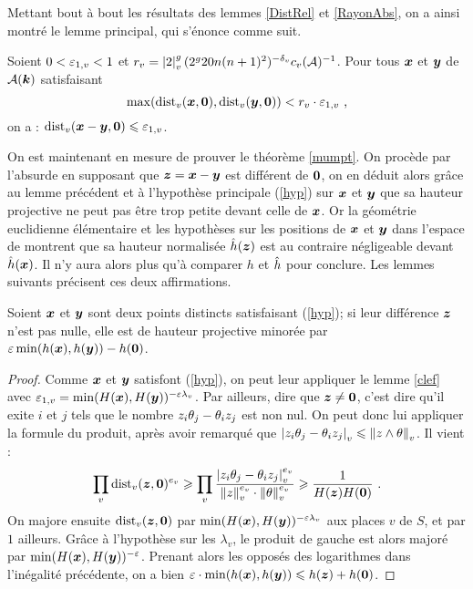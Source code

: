 Mettant bout à bout les résultats des lemmes \ref{DistRel} et \ref{RayonAbs}, on a ainsi montré le lemme principal, qui s'énonce comme suit.

\begin{lem} \label{clef}
Soient $0 < \varepsilon_{1,v} < 1$ et $r_v = \left\lvert2\right\rvert_{v}^g (2^g20n(n+1)^2)^{-{\delta_v}}c_v(\mathcal{A})^{-1}$. Pour tous ${\boldsymbol{x}}$ et ${\boldsymbol{y}}$ de $\mathcal{A}(\boldsymbol{k})$ satisfaisant 
\[ \max ( \mathrm{dist}_v({\boldsymbol{x}}, {\boldsymbol{0}}), \mathrm{dist}_v({\boldsymbol{y}}, {\boldsymbol{0}}) ) < r_v \cdot \varepsilon_{1,v} \text{ ,} \]
on a : $\mathrm{dist}_v({\boldsymbol{x}}-{\boldsymbol{y}}, {\boldsymbol{0}}) \leqslant \varepsilon_{1,v}$.
\end{lem}

On est maintenant en mesure de prouver le théorème \ref{mumpt}. On procède par l'absurde en supposant que ${\boldsymbol{z}} = {\boldsymbol{x}} - {\boldsymbol{y}}$ est différent de ${\boldsymbol{0}}$, on en déduit alors grâce au lemme précédent et à l'hypothèse principale (\ref{hyp}) sur ${\boldsymbol{x}}$ et ${\boldsymbol{y}}$ que sa hauteur projective ne peut pas être trop petite devant celle de ${\boldsymbol{x}}$. Or la géométrie euclidienne élémentaire et les hypothèses sur les positions de ${\boldsymbol{x}}$ et ${\boldsymbol{y}}$ dans l'espace de  montrent que sa hauteur normalisée $\hat{h}({\boldsymbol{z}})$ est au contraire négligeable devant $\hat{h}({\boldsymbol{x}})$. Il n'y aura alors plus qu'à comparer $h$ et $\hat{h}$ pour conclure. Les lemmes suivants précisent ces deux affirmations.

\begin{lem} \label{papti}
Soient ${\boldsymbol{x}}$ et ${\boldsymbol{y}}$ sont deux points distincts satisfaisant (\ref{hyp}); si leur différence ${\boldsymbol{z}}$ n'est pas nulle, elle est de hauteur projective minorée par $\varepsilon \min(h({\boldsymbol{x}}), h({\boldsymbol{y}})) - h({\boldsymbol{0}})$.
\end{lem}

\begin{proof}
Comme ${\boldsymbol{x}}$ et ${\boldsymbol{y}}$ satisfont (\ref{hyp}), on peut leur appliquer le lemme \ref{clef} avec $\varepsilon_{1, v} = \min(H({\boldsymbol{x}}), H({\boldsymbol{y}}))^{-\varepsilon\lambda_v}$. Par ailleurs, dire que ${\boldsymbol{z}} \neq {\boldsymbol{0}}$, c'est dire qu'il exite $i$ et $j$ tels que le nombre $z_i \theta_j - \theta_i z_j$ est non nul. On peut donc lui appliquer la formule du produit, après avoir remarqué que $\left\lvert z_i \theta_j - \theta_i z_j\right\rvert_{v} \leqslant \left\lVert z\wedge \theta\right\rVert_{v}$. Il vient :
\[ \prod_v \mathrm{dist}_v({\boldsymbol{z}}, {\boldsymbol{0}})^{e_v} \geqslant \prod_v \frac{\left\lvert z_i \theta_j - \theta_i z_j\right\rvert_{v}^{e_v}}{\left\lVert z\right\rVert_{v}^{e_v}\cdot\left\lVert\theta\right\rVert_{v}^{e_v}}
  \geqslant \frac{1}{H({\boldsymbol{z}}) H({\boldsymbol{0}})} \text{ .} \]
On majore ensuite $\mathrm{dist}_v({\boldsymbol{z}}, {\boldsymbol{0}})$ par $\min(H({\boldsymbol{x}}), H({\boldsymbol{y}}))^{-\varepsilon\lambda_v}$ aux places $v$ de $S$, et par $1$ ailleurs. Grâce à l'hypothèse sur les $\lambda_v$, le produit de gauche est alors majoré par $\min(H({\boldsymbol{x}}), H({\boldsymbol{y}}))^{-\varepsilon}$. Prenant alors les opposés des logarithmes dans l'inégalité précédente, on a bien $\varepsilon \cdot \min(h({\boldsymbol{x}}), h({\boldsymbol{y}})) \leqslant h({\boldsymbol{z}}) + h({\boldsymbol{0}})$.
\end{proof}


